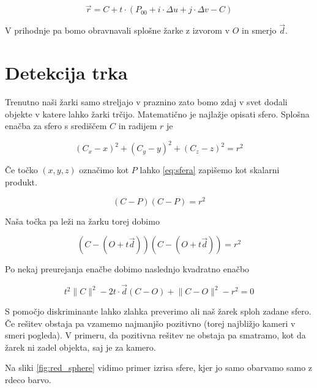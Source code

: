 \documentclass[12pt, a4paper]{article}
\begin{document}
\begin{equation}
	\vec{r} = C + t \cdot (P_{00} + i \cdot \Delta u + j \cdot \Delta v - C)
\end{equation}

V prihodnje pa bomo obravnavali splošne žarke z izvorom v $O$ in smerjo $\vec{d}$.

\section{Detekcija trka}

Trenutno naši žarki samo streljajo v praznino zato bomo zdaj v svet dodali objekte v katere lahko žarki trčijo.
Matematično je najlažje opisati sfero. Splošna enačba za sfero s središčem $C$ in radijem $r$ je

\begin{equation}
	\label{eq:sfera}
	(C_{x} - x)^2  + (C_{y} - y)^2  + (C_{z} - z)^2  = r^2
\end{equation}

Če točko $(x,y,z)$ označimo kot $P$ lahko \ref{eq:sfera} zapišemo kot skalarni produkt.

\begin{equation}
	(C - P)(C - P) = r^2
\end{equation}

Naša točka pa leži na žarku torej dobimo

\begin{equation}
	(C - (O + t \vec{d}))(C - (O + t \vec{d})) = r^2
\end{equation}

Po nekaj preurejanja enačbe dobimo naslednjo kvadratno enačbo

\begin{equation}
	t^2 \lVert C \rVert ^2  - 2 t \cdot \vec{d} (C - O) + \lVert C - O \rVert ^2  - r^2 = 0
\end{equation}

S pomočjo diskriminante lahko zlahka preverimo ali naš žarek sploh zadane sfero. Če rešitev obstaja pa vzamemo
najmanjšo pozitivno (torej najbližjo kameri v smeri pogleda). V primeru, da pozitivna rešitev ne obstaja pa
smatramo, kot da žarek ni zadel objekta, saj je za kamero.

Na sliki \ref{fig:red_sphere} vidimo primer izrisa sfere, kjer jo samo obarvamo samo z rdeco barvo.
\end{document}
